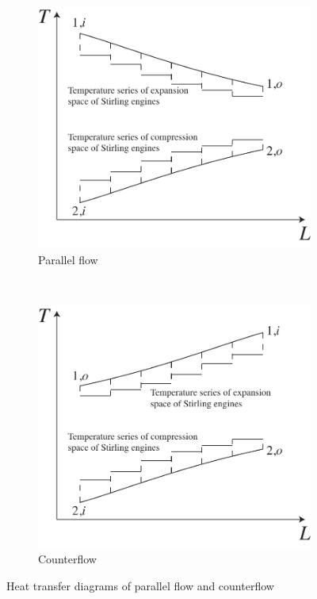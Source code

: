 \noindent \begin{figure}[htbp]
\centering
	\begin{subfigure}[b]{0.45\columnwidth}
	\includegraphics[width = \columnwidth]{fig/HeatTransfer_Parallel.pdf}
	\caption{Parallel flow}\label{fig:ParallelFlow}
	\end{subfigure}
	~
\begin{subfigure}[b]{0.45\columnwidth}
	\includegraphics[width = \columnwidth]{fig/HeatTransfer_Counter.pdf}
	\caption{Counterflow}\label{fig:CounterFlow}
	\end{subfigure}
	\caption{Heat transfer diagrams of parallel flow and counterflow}
	\label{fig:twoFlowTypes}
\end{figure}

